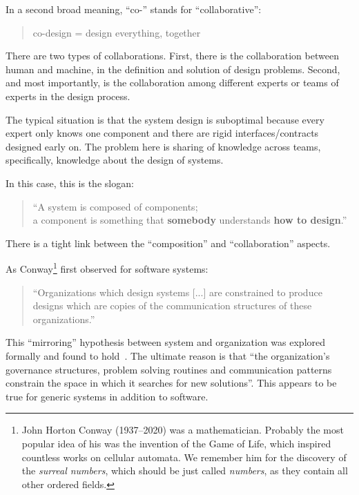 In a second broad meaning, ``co-'' stands for ``collaborative'':

\begin{quote}
    co-design = design everything, together
\end{quote}


There are two types of collaborations.
First, there is the collaboration between human and machine, in the definition and solution of design problems.
Second, and most importantly, is the collaboration among different experts or teams of experts in the design process.

The typical situation is that the system design is suboptimal because every expert only knows one component and there are rigid interfaces/contracts designed early on.
The problem here is sharing of knowledge across teams, specifically, knowledge about the design of systems.

In this case, this is the slogan:

\begin{quote}
    \enquote{A system is composed of components;\\
    a component is something that \textbf{somebody} understands
    \textbf{how to design}.}
\end{quote}


There is a tight link between the ``composition'' and ``collaboration'' aspects.

As Conway\footnote{John Horton Conway (1937--2020) was a mathematician. Probably the most popular idea of his was the invention of the Game of Life, which inspired countless works on cellular automata. We remember him for the discovery of the \emph{surreal numbers}, which should be just called \emph{numbers}, as they contain all other ordered fields.} first observed for software systems:

\begin{quote}
    \enquote{Organizations which design systems [...] are constrained to produce designs which are copies of the communication structures of these organizations.}
\end{quote}


This ``mirroring'' hypothesis between system and organization was explored formally and found to hold~\cite{maccormack12exploring}. The ultimate reason is that ``the organization's governance structures, problem solving routines and communication patterns constrain the space in which it searches for new solutions''. This appears to be true for generic systems in addition to software.

